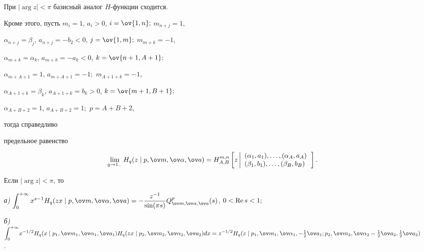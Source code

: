  


\begin{thms} 


При $|\arg z|<\pi$ базисный аналог $H$-функции сходится. 


Кроме этого, пусть $m_i=1$, $a_i>0$, $i=\ov{1,n};$ $m_{n+j}=1$, 


$\alpha_{n+j}=\beta_j$, $a_{n+j}=-b_2<0$, $j=\ov{1,m};$ $m_{m+k}=-1$, 


$\alpha_{m+k}=\alpha_k$, $a_{m+k}=-a_k<0$, $k=\ov{n+1,A+1};$ 


$\alpha_{m+A+1}=1$, $a_{m+A+1}=-1;$ $m_{A+1+k}=-1$, 


$\alpha_{A+1+k}=\beta_k$, $a_{A+1+k}=b_k>0$, $k=\ov{m+1,B+1};$ 


$\alpha_{A+B+2}=1$, $a_{A+B+2}=1;$ $p=A+B+2$, 


тогда справедливо 


предельное равенство 


$$ 


\lim_{q\to1_-}H_q(z\mid p,\ov m,\ov\alpha,\ov a)= 


H^{m,n}_{A,B}\left[z\left|


\displaystyle{ 


\begin{array}{l} 


(\alpha_1,a_1),\dotsc,(\alpha_A,a_A) \\ 


(\beta_1,b_1),\dotsc,(\beta_B,b_B) 


\end{array} 


} 


\right.\right].


$$ 


\end{thms} 


 


\begin{thms} 


Если $|\arg z|<\pi$, то 


 


{\em а)} $\displaystyle{\int^{+\infty}_0 x^{s-1} 


H_q(z x\mid p,\ov m,\ov\alpha,\ov a)=- 


\frac{z^{-1}}{\sin(\pi s)} 


Q^p_{\ov m,\ov\alpha,\ov a}(s)}$, $0<\re s<1;$ 


 


{\em б)} $\displaystyle{\int^{+\infty}_0}x^{-1/2}H_q 


(x\mid p_1,\ov m_1,\ov\alpha_1,\ov a_1)H_q(z x\mid 


p_2,\ov m_2,\ov\alpha_2,\ov a_2)dx=z^{-1/2}H_q(z\mid 


p_1,\ov m_1,\ov\alpha_1,-\tfrac{1}{2}\ov a_1; 


p_2,\ov m_2,\linebreak


\ov\alpha_2-\tfrac{1}{2}\ov a_2,\tfrac{1}{2}\ov a_2)$. 


\end{thms} 


